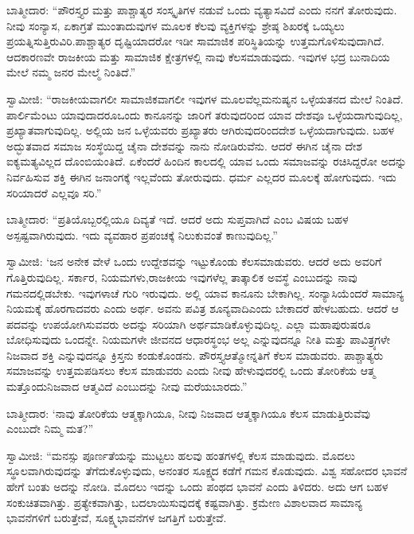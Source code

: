 \vskip 0.1cm

ಬಾತ್ಮೀದಾರ: “ಪೌರಸ್ತ್ಯರ ಮತ್ತು ಪಾಶ್ಚಾತ್ಯರ ಸಂಸ್ಕೃತಿಗಳ ನಡುವೆ ಒಂದು ವ್ಯತ್ಯಾಸವಿದೆ ಎಂದು ನನಗೆ ತೋರುವುದು. ನೀವು ಸಂನ್ಯಾಸ, ಏಕಾಗ್ರತೆ ಮುಂತಾದುವುಗಳ ಮೂಲಕ ಕೆಲವು ವ್ಯಕ್ತಿಗಳನ್ನು ಶ್ರೇಷ್ಠ ಶಿಖರಕ್ಕೆ ಒಯ್ಯಲು ಪ್ರಯತ್ನಿಸುತ್ತಿರುವಿರಿ.\break ಪಾಶ್ಚಾತ್ಯರ ದೃಷ್ಟಿಯಾದರೋ ಇಡೀ ಸಾಮಾಜಿಕ ಪರಿಸ್ಥಿತಿಯನ್ನು ಉತ್ತಮಗೊಳಿಸುವುದಾಗಿದೆ. ಆದಕಾರಣವೇ ರಾಜಕೀಯ ಮತ್ತು ಸಾಮಾಜಿಕ ಕ್ಷೇತ್ರಗಳಲ್ಲಿ ನಾವು ಕೆಲಸ\break ಮಾಡುವುದು. ಇವುಗಳ ಭದ್ರ ಬುನಾದಿಯ ಮೇಲೆ ನಮ್ಮ ಜನರ ಮೇಲ್ಮೆ ನಿಂತಿದೆ.”

\vskip 0.1cm

ಸ್ವಾಮೀಜಿ: “ರಾಜಕೀಯವಾಗಲೀ ಸಾಮಾಜಿಕವಾಗಲೀ ಇವುಗಳ ಮೂಲವೆಲ್ಲ\break ಮನುಷ್ಯನ ಒಳ್ಳೆಯತನದ ಮೇಲೆ ನಿಂತಿದೆ. ಪಾರ್ಲಿಮೆಂಟು ಯಾವುದಾದರೂ\break ಒಂದು ಕಾನೂನನ್ನು ಜಾರಿಗೆ ತರುವುದರಿಂದ ಯಾವ ದೇಶವೂ ಒಳ್ಳೆಯದಾಗುವುದಿಲ್ಲ, ಪ್ರಖ್ಯಾತವಾಗುವುದಿಲ್ಲ. ಅಲ್ಲಿಯ ಜನ ಒಳ್ಳೆಯವರು ಪ್ರಖ್ಯಾತರು ಆಗಿರುವುದರಿಂದ\break ದೇಶ ಒಳ್ಳೆಯದಾಗುವುದು. ಬಹಳ ಅದ್ಭುತವಾದ ಸಮಾಜ ಸಂಸ್ಥೆಯಿದ್ದ ಚೈನಾ ದೇಶವನ್ನು ನಾನು ನೋಡಿರುವೆನು. ಆದರೆ ಈಗಿನ ಚೈನಾ ದೇಶ ಐಕ್ಯಮತ್ಯವಿಲ್ಲದ ದೊಂಬಿಯಂತಿದೆ. ಏಕೆಂದರೆ ಹಿಂದಿನ ಕಾಲದಲ್ಲಿ ಯಾವ ಒಂದು ಸಮಾಜವನ್ನು ರಚಿಸಿದ್ದರೋ ಅದನ್ನು ನಿರ್ವಹಿಸುವ ಶಕ್ತಿ ಈಗಿನ ಜನಾಂಗಕ್ಕೆ ಇಲ್ಲವೆಂದು ತೋರುವುದು. ಧರ್ಮ ಎಲ್ಲದರ ಮೂಲಕ್ಕೆ ಹೋಗುವುದು. ಇದು ಸರಿಯಾದರೆ ಎಲ್ಲವೂ ಸರಿ.”

\vskip 0.1cm

ಬಾತ್ಮೀದಾರ: “ಪ್ರತಿಯೊಬ್ಬರಲ್ಲಿಯೂ ದಿವ್ಯತೆ ಇದೆ. ಆದರೆ ಅದು ಸುಪ್ತವಾಗಿದೆ ಎಂಬ ವಿಷಯ ಬಹಳ ಅಸ್ಪಷ್ಟವಾಗಿರುವುದು. ಇದು ವ್ಯವಹಾರ ಪ್ರಪಂಚಕ್ಕೆ ನಿಲುಕುವಂತೆ ಕಾಣುವುದಿಲ್ಲ.”

\vskip 0.1cm

ಸ್ವಾಮೀಜಿ: ‘ಜನ ಅನೇಕ ವೇಳೆ ಒಂದು ಉದ್ದೇಶವನ್ನು ಇಟ್ಟುಕೊಂಡು ಕೆಲಸ\break ಮಾಡುವರು. ಆದರೆ ಅದು ಅವರಿಗೆ ಗೊತ್ತಿರುವುದಿಲ್ಲ. ಸರ್ಕಾರ, ನಿಯಮಗಳು,\break ರಾಜಕೀಯ ಇವುಗಳೆಲ್ಲ ತಾತ್ಕಾಲಿಕ ಅವಸ್ಥೆ ಎಂಬುದನ್ನು ನಾವು ಗಮನದಲ್ಲಿಡಬೇಕು. ಇವುಗಳಾಚೆ ಗುರಿ ಇರುವುದು. ಅಲ್ಲಿ ಯಾವ ಕಾನೂನು ಬೇಕಾಗಿಲ್ಲ. ಸಂನ್ಯಾಸಿಯೆಂದರೆ ಸಾಮಾನ್ಯ ನಿಯಮಕ್ಕೆ ಹೊರಗಾದವರು ಎಂದು ಅರ್ಥ. ಅವನು ಪವಿತ್ರ ಶೂನ್ಯವಾದಿ\break ಎಂದು ಬೇಕಾದರೆ ಹೇಳಬಹುದು. ಆದರೆ ಆ ಪದವನ್ನು ಉಪಯೋಗಿಸುವವರು ಅದನ್ನು ಸರಿಯಾಗಿ ಅರ್ಥಮಾಡಿಕೊಳ್ಳುವುದಿಲ್ಲ. ಎಲ್ಲಾ ಮಹಾಪುರುಷರೂ ಬೋಧಿಸುವುದು ಒಂದನ್ನೇ. ನಿಯಮಗಳೇ ಜೀವನದ ಆಧಾರಸ್ಥಂಭ ಅಲ್ಲ ಎನ್ನುವುದನ್ನೂ ನೀತಿ ಮತ್ತು ಪಾವಿತ್ರ್ಯಗಳೇ ನಿಜವಾದ ಶಕ್ತಿ ಎನ್ನುವುದನ್ನೂ ಕ್ರಿಸ್ತನು ಕಂಡುಕೊಂಡನು. ಪೌರಸ್ತ್ಯ\break ಆತ್ಮೋನ್ನತಿಗೆ ಕೆಲಸ ಮಾಡುವರು. ಪಾಶ್ಚಾತ್ಯರು ಸಮಾಜವನ್ನು ಉತ್ತಮಪಡಿಸಲು ಕೆಲಸ ಮಾಡುವರು ಎಂದು ನೀವು ಹೇಳುವುದರಲ್ಲಿ ಒಂದು ತೋರಿಕೆಯ ಆತ್ಮ ಮತ್ತೊಂದು\break ನಿಜವಾದ ಆತ್ಮವಿದೆ ಎಂಬುದನ್ನು ನೀವು ಮರೆಯಬಾರದು.”

\eject

ಬಾತ್ಮೀದಾರ: ‘ನಾವು ತೋರಿಕೆಯ ಆತ್ಮಕ್ಕಾಗಿಯೂ, ನೀವು ನಿಜವಾದ ಆತ್ಮಕ್ಕಾಗಿಯೂ ಕೆಲಸ ಮಾಡುತ್ತಿರುವೆವು ಎಂಬುದೇ ನಿಮ್ಮ ಮತ?”

\vskip 0.1cm

ಸ್ವಾಮೀಜಿ: “ಮನಸ್ಸು ಪೂರ್ಣತೆಯನ್ನು ಮುಟ್ಟಲು ಹಲವು ಹಂತಗಳಲ್ಲಿ ಕೆಲಸ ಮಾಡುವುದು. ಮೊದಲು ಸ್ಥೂಲವಾಗಿರುವುದನ್ನು ತೆಗೆದುಕೊಳ್ಳುವುದು, ಅನಂತರ ಸೂಕ್ಷ್ಮದ ಕಡೆಗೆ ಗಮನ ಕೊಡುವುದು. ವಿಶ್ವ ಸಹೋದರ ಭಾವನೆ ಹೇಗೆ ಬಂತು ಅದನ್ನು ನೋಡಿ. ಮೊದಲು ಇದನ್ನು ಒಂದು ಪಂಥದ ಭಾವನೆ ಎಂದು ತಿಳಿದರು. ಅದು ಆಗ ಬಹಳ ಸಂಕುಚಿತವಾಗಿತ್ತು. ಪ್ರತ್ಯೇಕವಾಗಿತ್ತು, ಬದಲಾಯಿಸುವುದಕ್ಕೆ ಕಷ್ಟವಾಗಿತ್ತು. ಕ್ರಮೇಣ ವಿಶಾಲವಾದ ಸಾಮಾನ್ಯ ಭಾವನೆಗಳಿಗೆ ಬರುತ್ತೇವೆ, ಸೂಕ್ಷ್ಮಭಾವನೆಗಳ ಜಗತ್ತಿಗೆ ಬರುತ್ತೇವೆ.

